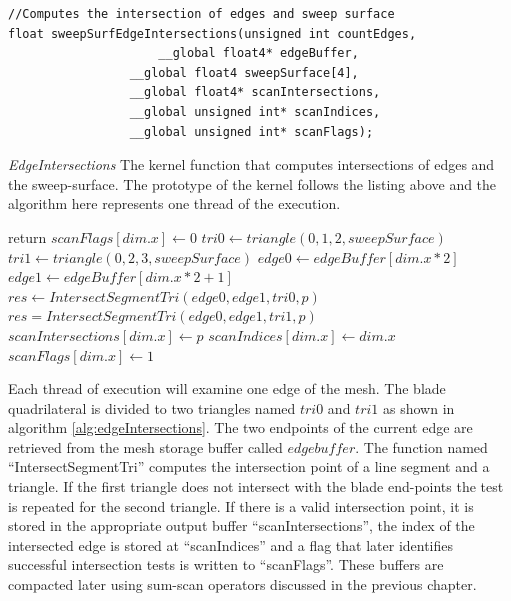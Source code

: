 \begin{lstlisting}[frame=single]
//Computes the intersection of edges and sweep surface
float sweepSurfEdgeIntersections(unsigned int countEdges,
			         __global float4* edgeBuffer,
				 __global float4 sweepSurface[4],
				 __global float4* scanIntersections,
				 __global unsigned int* scanIndices,
				 __global unsigned int* scanFlags);
\end{lstlisting}
		     
\begin{algorithm}[H]
\caption{\textit{EdgeIntersections} The kernel function that computes intersections of edges 
and the sweep-surface. The prototype of the kernel follows the listing above and the algorithm here represents one 
thread of the execution. }
\label{alg:edgeIntersections}
\begin{algorithmic}[1]	
  \STATE return
  \ENDIF
  \STATE $scanFlags[dim.x] \gets 0$
  \STATE $tri0 \gets triangle(0, 1, 2, sweepSurface)$
  \STATE $tri1 \gets triangle(0, 2, 3, sweepSurface)$
  \STATE $edge0 \gets edgeBuffer[dim.x * 2]$
  \STATE $edge1 \gets edgeBuffer[dim.x * 2 + 1]$
  \STATE $res \gets IntersectSegmentTri(edge0, edge1, tri0, p)$
  \STATE $res = IntersectSegmentTri(edge0, edge1, tri1, p)$
  \ENDIF
  \STATE $scanIntersections[dim.x] \gets p$
  \STATE $scanIndices[dim.x] \gets dim.x$
  \STATE $scanFlags[dim.x] \gets 1$
  \ENDIF
  
\end{algorithmic}
\end{algorithm}

Each thread of execution will examine one edge of the mesh. The blade quadrilateral is divided to two triangles named $tri0$ and $tri1$ 
as shown in algorithm \ref{alg:edgeIntersections}. The two endpoints of the current edge are retrieved from the mesh storage buffer called 
$edgebuffer$. The function named ``IntersectSegmentTri'' computes the intersection point of a line segment and a triangle. If the
first triangle does not intersect with the blade end-points the test is repeated for the second triangle. If there is a
valid intersection point, it is stored in the appropriate output buffer ``scanIntersections'', the index of the intersected edge is stored at
``scanIndices'' and a flag that later identifies successful intersection tests is written to ``scanFlags''. These buffers are compacted later 
using sum-scan operators discussed in the previous chapter. 


